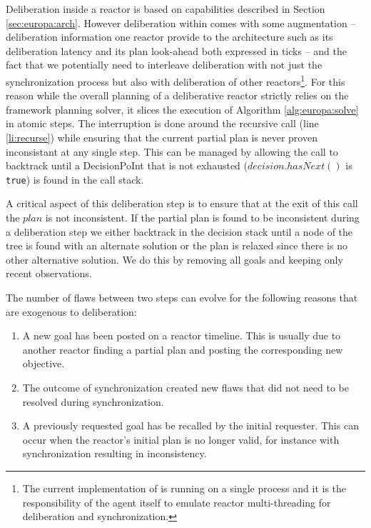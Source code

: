 Deliberation inside a reactor is based on \eu capabilities described
in Section \ref{sec:europa:arch}. However deliberation within \rx
comes with some augmentation -- deliberation information one reactor
provide to the architecture such as its deliberation latency and its
plan look-ahead both expressed in ticks -- and the fact that we
potentially need to interleave deliberation with not just the
synchronization process but also with deliberation of other
reactors\footnote{The current implementation of \rx is running on a
  single process and it is the responsibility of the agent itself to
  emulate reactor multi-threading for deliberation and
  synchronization.}. For this reason while the overall planning of a
deliberative reactor strictly relies on the \eu framework planning
solver, it slices the execution of Algorithm \ref{alg:europa:solve} in
atomic steps. The interruption is done around the recursive call (line
\ref{li:recurse}) while ensuring that the current partial plan is
never proven inconsistant at any single step. This can be managed by
allowing the call to backtrack until a \textsf{DecisionPoInt} that is
not exhausted (\ie $decision.hasNext()$ is \texttt{true}) is found in
the call stack.

A critical aspect of this deliberation step is to ensure that at the
exit of this call the $plan$ is not inconsistent. %
If the partial plan is found to be inconsistent during a deliberation
step we either backtrack in the decision stack until a node of the
tree is found with an alternate solution or the plan is relaxed since
there is no other alternative solution. We do this by removing all
goals and keeping only recent observations. %

The number of flaws between two steps  can evolve for the following reasons that are exogenous
to deliberation:

\begin{enumerate}

\item A new goal has been posted on a reactor timeline. This is
  usually due to another reactor finding a partial plan and posting
  the corresponding new objective.

\item The outcome of synchronization created new flaws that did not
  need to be resolved during synchronization.

\item A previously requested goal has be recalled by the initial
  requester. This can occur when the reactor's initial plan is no
  longer valid, for instance with synchronization resulting in
  inconsistency.

\end{enumerate}

